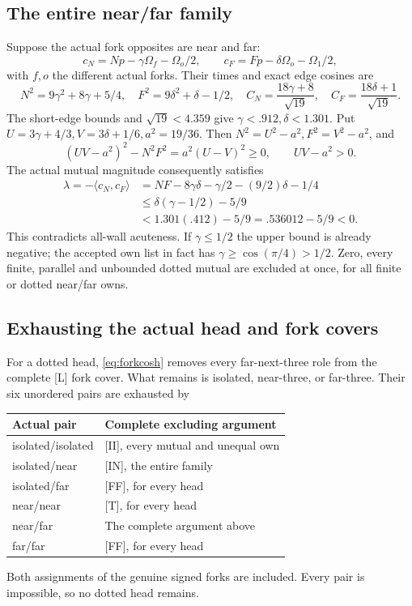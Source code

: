 \documentclass[11pt]{article}
\theoremstyle{definition}
\theoremstyle{remark}
\newcommand{\ip}[2]{\langle #1,#2\rangle}
\newcommand{\src}[1]{\textnormal{\textsf{[#1]}}}
\begin{document}
\subsection{The entire near/far family}
Suppose the actual fork opposites are near and far:
\[
 c_N=Np-\gamma\Omega_f-\Omega_o/2,\qquad
 c_F=Fp-\delta\Omega_o-\Omega_1/2,
\]
with \(f,o\) the different actual forks.
Their times and exact edge cosines are
\[
 N^2=9\gamma^2+8\gamma+5/4,\quad
 F^2=9\delta^2+\delta-1/2,\quad
 C_N=\frac{18\gamma+8}{\sqrt{19}},\quad
 C_F=\frac{18\delta+1}{\sqrt{19}}.
\]
The short-edge bounds and \(\sqrt{19}<4.359\) give
\(\gamma<.912,\delta<1.301\).
Put \(U=3\gamma+4/3,V=3\delta+1/6,a^2=19/36\).
Then \(N^2=U^2-a^2,F^2=V^2-a^2\), and
\[
 (UV-a^2)^2-N^2F^2=a^2(U-V)^2\geq0,\qquad UV-a^2>0.
\]
The actual mutual magnitude consequently satisfies
\begin{align*}
 \lambda=-\ip{c_N}{c_F}
 &=NF-8\gamma\delta-\gamma/2-(9/2)\delta-1/4\\
 &\leq\delta(\gamma-1/2)-5/9\\
 &<1.301(.412)-5/9=.536012-5/9<0.
\end{align*}
This contradicts all-wall acuteness. If \(\gamma\leq1/2\)
the upper bound is already negative; the accepted own list
in fact has \(\gamma\geq\cos(\pi/4)>1/2\).
Zero, every finite, parallel and unbounded dotted mutual
are excluded at once, for all finite or dotted near/far owns.

\subsection{Exhausting the actual head and fork covers}
For a dotted head, \eqref{eq:forkcosh} removes every
far-next-three role from the complete \src{L} fork cover.
What remains is isolated, near-three, or far-three.
Their six unordered pairs are exhausted by
\begin{center}\small
\begin{tabular}{ll}
\toprule
Actual pair&Complete excluding argument\\ \midrule
isolated/isolated&\src{II}, every mutual and unequal own\\
isolated/near&\src{IN}, the entire family\\
isolated/far&\src{FF}, for every head\\
near/near&\src{T}, for every head\\
near/far&The complete argument above\\
far/far&\src{FF}, for every head\\ \bottomrule
\end{tabular}
\end{center}
Both assignments of the genuine signed forks are included.
Every pair is impossible, so no dotted head remains.
\end{document}
